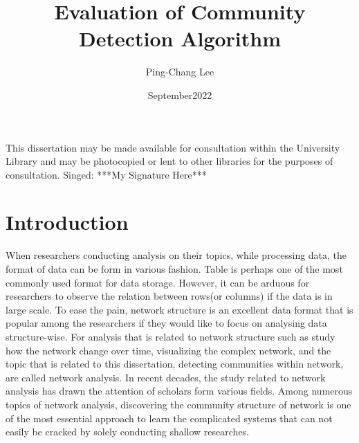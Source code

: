 \documentclass[12pt]{article}
\title{Evaluation of Community Detection Algorithm}
\author{Ping-Chang Lee}
\affil{MSc in Data Science \& Statistics \\ The University of Bath}
\date{{September}{2022}}
\begin{document}
\maketitle
\pagebreak

    
\bigbreak\bigbreak\bigbreak
\bigbreak\bigbreak\bigbreak
\bigbreak\bigbreak\bigbreak

This dissertation may be made available for consultation within the University Library and may be photocopied or lent to other libraries for the purposes of consultation.
\bigbreak\bigbreak\bigbreak
Singed: ***My Signature Here***
\pagebreak


\tableofcontents
\pagebreak

\section{Introduction}
When researchers conducting analysis on their topics, while processing data, the format of data can be form in various fashion. Table is perhaps one of the most commonly used format for data storage. However, it can be arduous for researchers to observe the relation between rows(or columns) if the data is in large scale. To ease the pain, network structure is an excellent data format that is popular among the researchers if they would like to focus on analysing data structure-wise. For analysis that is related to network structure such as study how the network change over time, visualizing the complex network, and the topic that is related to this dissertation, detecting communities within network, are called network analysis. In recent decades, the study related to network analysis has drawn the attention of scholars form various fields. Among numerous topics of network analysis, discovering the community structure of network is one of the most essential approach to learn the complicated systems that can not easily be cracked by solely conducting shallow researches\cite{1}. 

\bigbreak
\end{document}
